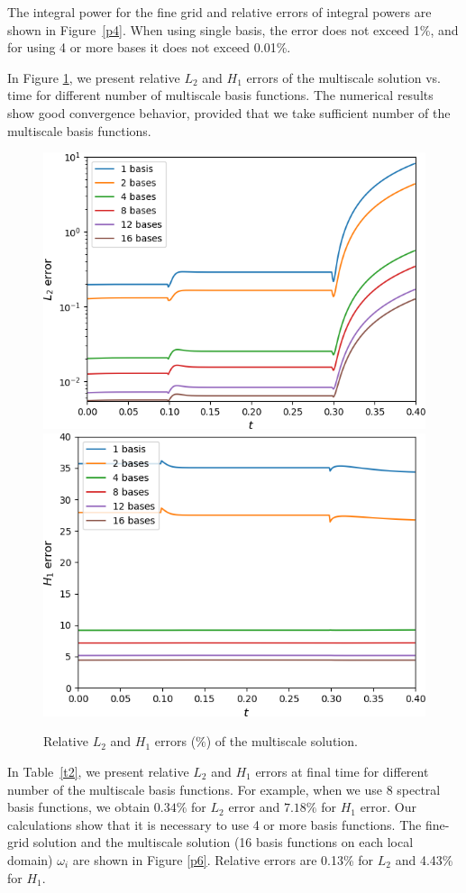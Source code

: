 \documentclass[runningheads]{llncs}
\begin{document}
The integral power for the fine grid and relative errors of integral powers are shown in Figure~\ref{p4}. 
When using single basis, the error does not exceed 1\%, and for using 4 or more bases it does not exceed 0.01\%.

In Figure \ref{p5}, we present relative $L_2$ and $H_1$ errors of the multiscale solution vs. time for different number of multiscale basis functions.
The numerical results show good convergence behavior, provided that we take sufficient number of the multiscale basis functions.

\begin{figure}[h!]
\centering
\includegraphics[width=0.45\linewidth]{L2_log.png} 
\hspace{2em}
\includegraphics[width=0.45\linewidth]{H1.png} 
\caption{Relative $L_2$ and $H_1$ errors ($\%$) of the multiscale solution.}
\label{p5}
\end{figure} 

In Table~\ref{t2}, we present relative $L_2$ and $H_1$ errors at final time for different number of the multiscale basis functions.
For example, when we use 8 spectral basis functions, we obtain $0.34$$\%$ for $L_2$ error and $7.18\%$ for $H_1$ error. 
Our calculations show that it is necessary to use 4 or more basis functions. 
The fine-grid solution and the multiscale solution (16 basis functions on each local domain) $\omega_i$ are shown in Figure \ref{p6}. Relative errors are 0.13\% for $L_2$ and 4.43\% for $H_1$. 
\end{document}

